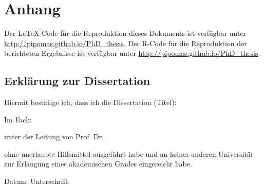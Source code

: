 \documentclass[11pt, twoside, a4paper]{book}		%
\begin{document}
\chapter[Anhang - Online-Material]{Anhang}

Der \LaTeX-Code für die Reproduktion dieses Dokuments ist verfügbar unter \url{http://pipomas.github.io/PhD_thesis}.
Der R-Code für die Reproduktion der berichteten Ergebnisse ist verfügbar unter \url{http://pipomas.github.io/PhD_thesis}.


\cleardoublepage
\section*{Erklärung zur Dissertation}

Hiermit bestätige ich, dass ich die Dissertation (Titel):

Im Fach: 

unter der Leitung von Prof. Dr.

ohne unerlaubte Hilfsmittel ausgeführt habe und an keiner anderen Universität zur Erlangung eines akademischen Grades eingereicht habe.

Datum:
Unterschrift:
\end{document}
